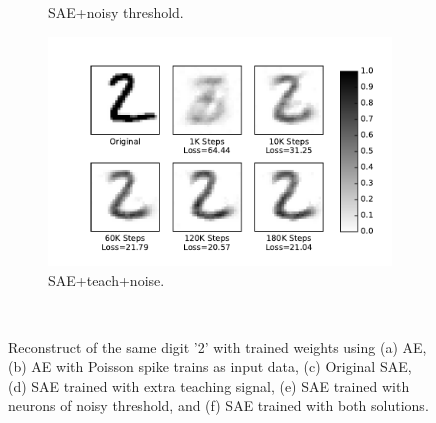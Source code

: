 \begin{figure}
\begin{subfigure}[t]{0.32\textwidth}
		\caption{SAE+noisy threshold.}
	\end{subfigure}
	\begin{subfigure}[t]{0.32\textwidth}
		\includegraphics[width=\textwidth]{pics_sdlm/43_MNIST_SAE_all/recon_digit.pdf}
		\caption{SAE+teach+noise.}
	\end{subfigure}\\
	\caption{Reconstruct of the same digit '2' with trained weights using (a) AE, (b) AE with Poisson spike trains as input data, (c) Original SAE, (d) SAE trained with extra teaching signal, (e) SAE trained with neurons of noisy threshold, and (f) SAE trained with both solutions.}
\end{figure}

